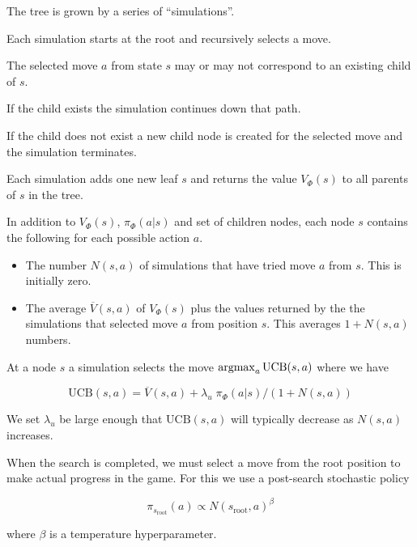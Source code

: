 {

\vfill
The tree is grown by a series of ``simulations''.

\vfill
Each simulation starts at the root and recursively selects a move.

\vfill
The selected move $a$ from state $s$ may or may not correspond to an existing child of $s$.

\vfill
If the child exists the simulation continues down that path.

\vfill
If the child does not exist a new child node is created for the selected move and the simulation terminates.

\vfill
Each simulation adds one new leaf $s$ and returns the value $V_\Phi(s)$ to all parents of $s$ in the tree.


In addition to $V_\Phi(s)$, $\pi_\Phi(a|s)$ and set of children nodes, each node $s$ contains
the following for each possible action $a$.

\vfill
\begin{itemize}
\item The number $N(s,a)$ of simulations that have tried move $a$ from $s$. This is initially zero.

\vfill
\item The average $\overline{V}(s,a)$ of $V_\Phi(s)$ plus the values returned by the the simulations that selected
 move $a$ from position $s$.  This averages $1 + N(s,a)$ numbers.
\end{itemize}


At a node $s$ a simulation selects the move $\operatorname*{argmax}_a \mathrm{UCB}(s,a)$ where we have

\vfill
$$\mathrm{UCB}(s,a) =   \overline{V}(s,a) + \lambda_u\; \pi_\Phi(a|s)/(1+N(s,a))$$

\vfill
We set $\lambda_u$ be large enough that $\mathrm{UCB}(s,a)$ will typically decrease as $N(s,a)$ increases.


When the search is completed, we must select a move from the root position to make actual progress in the game.  For this we use a post-search stochastic policy

\vfill
$$\pi_{s_{\mathrm{root}}}(a) \propto N(s_{\mathrm{root}},a)^\beta$$

\vfill
where $\beta$ is a temperature hyperparameter.

}
